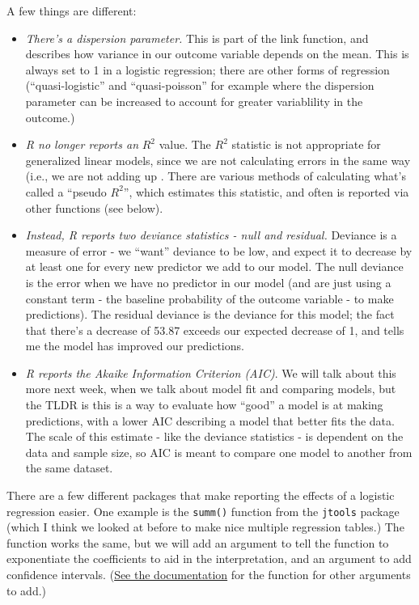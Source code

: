 \documentclass[
  letterpaper,
  DIV=11,
  numbers=noendperiod,
  oneside]{scrreprt}
\begin{document}
A few things are different:

\begin{itemize}
\item
  \emph{There's a dispersion parameter.} This is part of the link
  function, and describes how variance in our outcome variable depends
  on the mean. This is always set to 1 in a logistic regression; there
  are other forms of regression (``quasi-logistic'' and
  ``quasi-poisson'' for example where the dispersion parameter can be
  increased to account for greater variablility in the outcome.)
\item
  \emph{R no longer reports an} \(R^2\) value. The \(R^2\) statistic is
  not appropriate for generalized linear models, since we are not
  calculating errors in the same way (i.e., we are not adding up . There
  are various methods of calculating what's called a ``pseudo \(R^2\)'',
  which estimates this statistic, and often is reported via other
  functions (see below).
\item
  \emph{Instead, R reports two deviance statistics - null and residual.}
  Deviance is a measure of error - we ``want'' deviance to be low, and
  expect it to decrease by at least one for every new predictor we add
  to our model. The null deviance is the error when we have no predictor
  in our model (and are just using a constant term - the baseline
  probability of the outcome variable - to make predictions). The
  residual deviance is the deviance for this model; the fact that
  there's a decrease of 53.87 exceeds our expected decrease of 1, and
  tells me the model has improved our predictions.
\item
  \emph{R reports the Akaike Information Criterion (AIC)}. We will talk
  about this more next week, when we talk about model fit and comparing
  models, but the TLDR is this is a way to evaluate how ``good'' a model
  is at making predictions, with a lower AIC describing a model that
  better fits the data. The scale of this estimate - like the deviance
  statistics - is dependent on the data and sample size, so AIC is meant
  to compare one model to another from the same dataset.
\end{itemize}

There are a few different packages that make reporting the effects of a
logistic regression easier. One example is the \texttt{summ()} function
from the \texttt{jtools} package (which I think we looked at before to
make nice multiple regression tables.) The function works the same, but
we will add an argument to tell the function to exponentiate the
coefficients to aid in the interpretation, and an argument to add
confidence intervals.
(\href{https://www.jtools.jacob-long.com/articles/summ.html\#summ}{See
the documentation} for the function for other arguments to add.)
\end{document}
